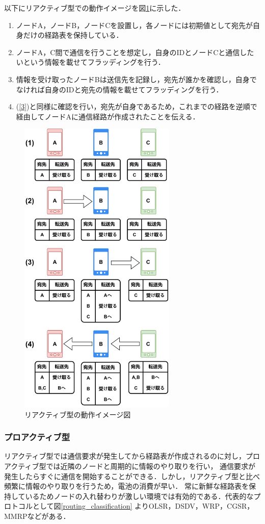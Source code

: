 \documentclass[a4paper, 11pt]{ltjsarticle}
\begin{document}
以下にリアクティブ型での動作イメージを図\ref{reactive}に示した．
\begin{enumerate}
  \renewcommand{\labelenumi}{(\arabic{enumi})}
  \item \label{1} ノードA，ノードB，ノードCを設置し，各ノードには初期値として宛先が自身だけの経路表を保持している．
  \item \label{2} ノードA，C間で通信を行うことを想定し，自身のIDとノードCと通信したいという情報を載せてフラッディングを行う．
  \item \label{3} 情報を受け取ったノードBは送信先を記録し，宛先が誰かを確認し，自身でなければ自身のIDと宛先の情報を載せてフラッディングを行う．
  \item \label{4} (\ref{3})と同様に確認を行い，宛先が自身であるため，これまでの経路を逆順で経由してノードAに通信経路が作成されたことを伝える．
\end{enumerate}

\begin{figure}[H]
  \centering
  \includegraphics[width=75mm]{reactive_model.pdf}
  \caption{リアクティブ型の動作イメージ図}
  \label{reactive}
\end{figure}

\clearpage
\subsubsection{プロアクティブ型}
リアクティブ型では通信要求が発生してから経路表が作成されるのに対し，プロアクティブ型では近隣のノードと周期的に情報のやり取りを行い，
通信要求が発生したらすぐに通信を開始することができる．しかし，リアクティブ型と比べ頻繁に情報のやり取りを行うため，電池の消費が早い．
常に新鮮な経路表を保持しているためノードの入れ替わりが激しい環境では有効的である．代表的なプロトコルとして図\ref{routing_classification}
よりOLSR，DSDV，WRP，CGSR，MMRPなどがある．
\end{document}
